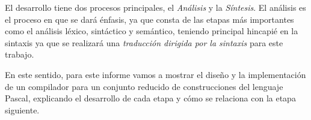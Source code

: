 \documentclass[a4paper]{report}
\begin{document}
El desarrollo tiene dos procesos principales, el \emph{Análisis} y la \emph{Síntesis}. El análisis es el proceso en que se dará énfasis, ya que consta de las etapas más importantes como el análisis léxico, sintáctico y semántico, teniendo principal hincapié en la sintaxis ya que se realizará una \emph{traducción dirigida por la sintaxis} para este trabajo.

En este sentido, para este informe vamos a mostrar el diseño y la implementación de un compilador para un conjunto reducido de construcciones del lenguaje Pascal, explicando el desarrollo de cada etapa y cómo se relaciona con la etapa siguiente.

\setcounter{page}{1}










\end{document}

